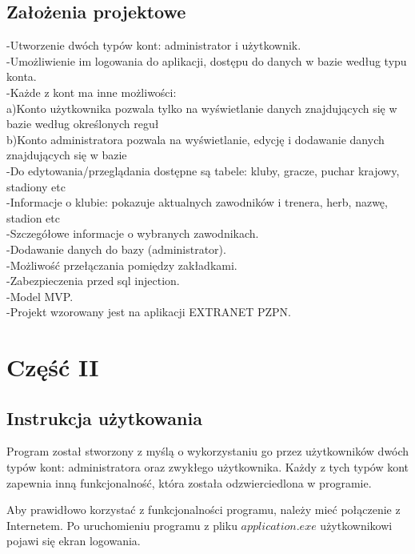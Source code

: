 \documentclass[12pt,a4paper]{article}
\begin{document}
    \subsection{Założenia projektowe}
    -Utworzenie dwóch typów kont: administrator i  użytkownik. \\
    -Umożliwienie im logowania do aplikacji, dostępu do danych w bazie według typu konta. \\
    -Każde z kont ma inne możliwości:\\
    a)Konto użytkownika pozwala tylko na wyświetlanie danych znajdujących się w bazie według określonych reguł\\
    b)Konto administratora pozwala na wyświetlanie, edycję i dodawanie danych znajdujących się w bazie \\
    -Do edytowania/przeglądania dostępne są tabele: kluby, gracze, puchar krajowy, stadiony etc \\
    -Informacje o klubie: pokazuje aktualnych zawodników i trenera, herb, nazwę, stadion etc \\
    -Szczegółowe informacje o wybranych zawodnikach. \\
    -Dodawanie danych do bazy (administrator). \\
    -Możliwość przełączania pomiędzy zakładkami. \\
    -Zabezpieczenia przed sql injection. \\
    -Model MVP. \\
    -Projekt wzorowany jest na aplikacji EXTRANET PZPN. \\

    \newpage
    \section{Część II}
    \subsection{Instrukcja użytkowania}
    Program został stworzony z myślą o wykorzystaniu go przez użytkowników dwóch typów kont: administratora oraz zwykłego użytkownika. Każdy z tych typów kont zapewnia inną funkcjonalność, która została odzwierciedlona w programie.

    Aby prawidłowo korzystać z funkcjonalności programu, należy mieć połączenie z Internetem. Po uruchomieniu programu z pliku $application.exe$ użytkownikowi pojawi się ekran logowania.
\end{document}
